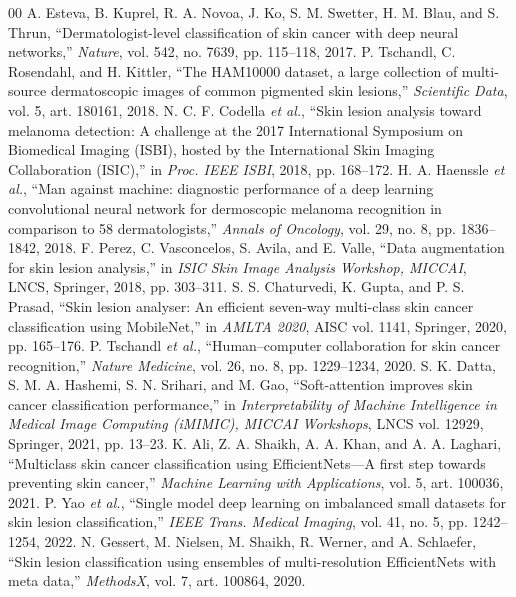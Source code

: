 \documentclass[conference]{IEEEtran}
\begin{document}
\begin{thebibliography}{00}
 A. Esteva, B. Kuprel, R. A. Novoa, J. Ko, S. M. Swetter, H. M. Blau, and S. Thrun, ``Dermatologist-level classification of skin cancer with deep neural networks,'' \emph{Nature}, vol. 542, no. 7639, pp. 115--118, 2017.
 P. Tschandl, C. Rosendahl, and H. Kittler, ``The HAM10000 dataset, a large collection of multi-source dermatoscopic images of common pigmented skin lesions,'' \emph{Scientific Data}, vol. 5, art. 180161, 2018.
 N. C. F. Codella \emph{et al.}, ``Skin lesion analysis toward melanoma detection: A challenge at the 2017 International Symposium on Biomedical Imaging (ISBI), hosted by the International Skin Imaging Collaboration (ISIC),'' in \emph{Proc. IEEE ISBI}, 2018, pp. 168--172.
 H. A. Haenssle \emph{et al.}, ``Man against machine: diagnostic performance of a deep learning convolutional neural network for dermoscopic melanoma recognition in comparison to 58 dermatologists,'' \emph{Annals of Oncology}, vol. 29, no. 8, pp. 1836--1842, 2018.
 F. Perez, C. Vasconcelos, S. Avila, and E. Valle, ``Data augmentation for skin lesion analysis,'' in \emph{ISIC Skin Image Analysis Workshop, MICCAI}, LNCS, Springer, 2018, pp. 303--311.
 S. S. Chaturvedi, K. Gupta, and P. S. Prasad, ``Skin lesion analyser: An efficient seven-way multi-class skin cancer classification using MobileNet,'' in \emph{AMLTA 2020}, AISC vol. 1141, Springer, 2020, pp. 165--176.
 P. Tschandl \emph{et al.}, ``Human--computer collaboration for skin cancer recognition,'' \emph{Nature Medicine}, vol. 26, no. 8, pp. 1229--1234, 2020.
 S. K. Datta, S. M. A. Hashemi, S. N. Srihari, and M. Gao, ``Soft-attention improves skin cancer classification performance,'' in \emph{Interpretability of Machine Intelligence in Medical Image Computing (iMIMIC), MICCAI Workshops}, LNCS vol. 12929, Springer, 2021, pp. 13--23.
 K. Ali, Z. A. Shaikh, A. A. Khan, and A. A. Laghari, ``Multiclass skin cancer classification using EfficientNets---A first step towards preventing skin cancer,'' \emph{Machine Learning with Applications}, vol. 5, art. 100036, 2021.
 P. Yao \emph{et al.}, ``Single model deep learning on imbalanced small datasets for skin lesion classification,'' \emph{IEEE Trans. Medical Imaging}, vol. 41, no. 5, pp. 1242--1254, 2022.
 N. Gessert, M. Nielsen, M. Shaikh, R. Werner, and A. Schlaefer, ``Skin lesion classification using ensembles of multi-resolution EfficientNets with meta data,'' \emph{MethodsX}, vol. 7, art. 100864, 2020.

\end{thebibliography}
\end{document}

